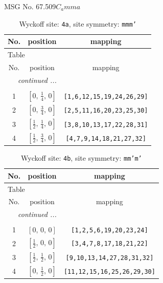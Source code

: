 \documentclass[fleqn,8pt]{jsarticle}
\begin{document}
\setcounter{MaxMatrixCols}{32}

\renewcommand{\tablename}{Table~}
\renewcommand{\figurename}{Figure~}
\begin{center}
\LARGE
MSG No. 67.509\quad$C_{a}mma$
\end{center}
\renewcommand{\arraystretch}{1.2}
\begin{longtable}{ccc}
\caption{Wyckoff site: {\tt 4a}, site symmetry: {\tt mmm'}}
 \\
 \hline \hline
No. & position & mapping \\ \hline \endfirsthead

\multicolumn{2}{l}{\tablename\ \thetable{}} \\
 \hline \hline
No. & position & mapping \\ \hline \endhead

 \hline \hline
\multicolumn{2}{r}{\footnotesize\it continued ...} \\ \endfoot

 \hline \hline
\multicolumn{2}{r}{} \\ \endlastfoot

1 & $\left[ 0,\, \frac{1}{4},\, 0 \right]$ & {\tt [1,6,12,15,19,24,26,29]} \\ \hline
2 & $\left[ 0,\, \frac{3}{4},\, 0 \right]$ & {\tt [2,5,11,16,20,23,25,30]} \\ \hline
3 & $\left[ \frac{1}{2},\, \frac{1}{4},\, 0 \right]$ & {\tt [3,8,10,13,17,22,28,31]} \\ \hline
4 & $\left[ \frac{1}{2},\, \frac{3}{4},\, 0 \right]$ & {\tt [4,7,9,14,18,21,27,32]} \\
\end{longtable}
\renewcommand{\arraystretch}{1.2}
\begin{longtable}{ccc}
\caption{Wyckoff site: {\tt 4b}, site symmetry: {\tt mm'm'}}
 \\
 \hline \hline
No. & position & mapping \\ \hline \endfirsthead

\multicolumn{2}{l}{\tablename\ \thetable{}} \\
 \hline \hline
No. & position & mapping \\ \hline \endhead

 \hline \hline
\multicolumn{2}{r}{\footnotesize\it continued ...} \\ \endfoot

 \hline \hline
\multicolumn{2}{r}{} \\ \endlastfoot

1 & $\left[ 0,\, 0,\, 0 \right]$ & {\tt [1,2,5,6,19,20,23,24]} \\ \hline
2 & $\left[ \frac{1}{2},\, 0,\, 0 \right]$ & {\tt [3,4,7,8,17,18,21,22]} \\ \hline
3 & $\left[ \frac{1}{2},\, \frac{1}{2},\, 0 \right]$ & {\tt [9,10,13,14,27,28,31,32]} \\ \hline
4 & $\left[ 0,\, \frac{1}{2},\, 0 \right]$ & {\tt [11,12,15,16,25,26,29,30]} \\
\end{longtable}
\end{document}
